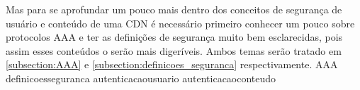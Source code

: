 \newline
Mas para se aprofundar um pouco mais dentro dos conceitos de seguran\c{c}a de usu\'ario e conte\'udo de uma CDN \'e necess\'ario primeiro conhecer um pouco sobre protocolos AAA e ter as defini\c{c}\~oes de seguran\c{c}a muito bem esclarecidas, pois assim esses conte\'udos o ser\~ao mais diger\'iveis. Ambos temas ser\~ao tratado em \ref{subsection:AAA} e \ref{subsection:definicoes_seguranca} respectivamente.
{AAA}
{definicoesseguranca}
{autenticacaousuario}
{autenticacaoconteudo}